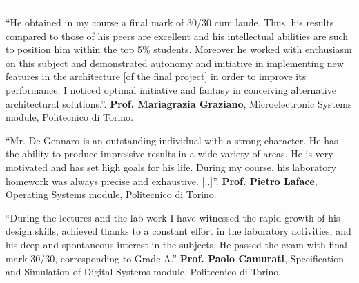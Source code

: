 \vspace{+2mm}\vspace{-3mm}
\rule{\textwidth}{0.5pt}\vspace{-1mm}

\begin{cventries}
\vspace{-4mm}

\cventry
{} %
{} %
{} %
{} %
{ %
\begin{cvitems}
\item{``He obtained in my course a final mark of 30/30 cum laude. Thus, 
his results compared to those of his peers are excellent and his intellectual 
abilities are such to position him within the top 5\% students. Moreover 
he worked with enthusiasm on this subject and demonstrated autonomy and 
initiative in implementing new features in the architecture [of the final 
project] in order to improve its performance. I noticed optimal initiative and 
fantasy in conceiving alternative architectural solutions.''.\newline
\hspace*{\fill}\textbf{Prof. Mariagrazia Graziano}, Microelectronic Systems 
module, Politecnico di 
Torino.\hspace{+6mm}\vspace{+4mm}}
\item{``Mr. De Gennaro is an outstanding individual with a strong 
character. He has the ability to produce impressive results in a wide variety 
of areas. He is very motivated and has set high goals for his life. During my 
course, his laboratory homework was always precise and exhaustive. 
[..]''.\newline
\hspace*{\fill}\textbf{Prof. Pietro Laface}, Operating Systems module, 
Politecnico di Torino.\hspace{+6mm}\vspace{+4mm}}
\item{``During the lectures and the lab work I have witnessed the rapid growth 
of his design skills, achieved thanks to a constant effort in the laboratory 
activities, and his deep and spontaneous interest in the subjects. He passed 
the exam with final mark 30/30, corresponding to Grade A.''\newline
\hspace*{\fill}\textbf{Prof. Paolo Camurati}, Specification and Simulation of 
Digital Systems module, Politecnico di Torino.\hspace{+6mm}\vspace{+0.1mm}}
\end{cvitems}
}
\end{cventries}\vspace{-3mm}